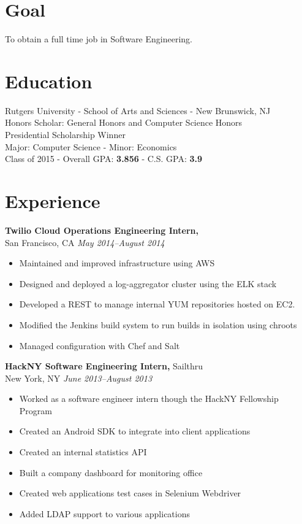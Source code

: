 \documentclass[margin]{res}
\begin{document}
 
\begin{resume} 

\section{Goal}
To obtain a full time job in Software Engineering.
 
\section{Education} 
Rutgers University - School of Arts and Sciences - New Brunswick, NJ\\
Honors Scholar: General Honors and Computer Science Honors\\
Presidential Scholarship Winner\\
Major: Computer Science - Minor: Economics\\
Class of 2015 - Overall GPA: {\bf 3.856} - C.S. GPA: {\bf 3.9}

\section{Experience}

{\bf Twilio Cloud Operations Engineering Intern,}\\
San Francisco, CA \textit{May 2014--August 2014}
\begin{itemize} \itemsep -2pt
    \item Maintained and improved infrastructure using AWS
    \item Designed and deployed a log-aggregator cluster using the ELK stack
    \item Developed a REST to manage internal YUM repositories hosted on EC2.
    \item Modified the Jenkins build system to run builds in isolation using
    chroots
    \item Managed configuration with Chef and Salt
\end{itemize}

{\bf HackNY Software Engineering Intern,} Sailthru\\
New York, NY \textit{June 2013--August 2013}
\begin{itemize} \itemsep -2pt
    \item Worked as a software engineer intern though the HackNY Fellowship
    Program
    \item Created an Android SDK to integrate into client applications
    \item Created an internal statistics API
    \item Built a company dashboard for monitoring office
    \item Created web applications test cases in Selenium Webdriver
    \item Added LDAP support to various applications
\end{itemize}



\end{resume}
\end{document}
